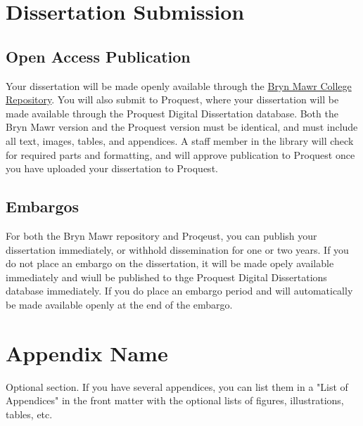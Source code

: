 \documentclass[12pt]{report}
\begin{document}
\chapter{Dissertation Submission}

\section{Open Access Publication}
Your dissertation will be made openly available through the \href{https://repository.brynmawr.edu/}{Bryn Mawr College Repository}. You will also submit to Proquest, where your dissertation will be made available through the Proquest Digital Dissertation database. Both the Bryn Mawr version and the Proquest version must be identical, and must include all text, images, tables, and appendices. A staff member in the library will check for required parts and formatting, and will approve publication to Proquest once you have uploaded your dissertation to Proquest.
\section{Embargos}
For both the Bryn Mawr repository and Proqeust, you can publish your dissertation immediately, or withhold dissemination for one or two years. If you do not place an embargo on the dissertation, it will be made opely available immediately and wiull be published to thge Proquest Digital Dissertations database immediately. If you do place an embargo period and will automatically be made available openly at the end of the embargo. 
\appendix
\chapter{Appendix Name}
Optional section. If you have several appendices, you can list them in a "List of Appendices" in the front matter with the optional lists of figures, illustrations, tables, etc.

\singlespacing
\printbibliography[heading=bibintoc, title={Bibliography}]
\end{document}
